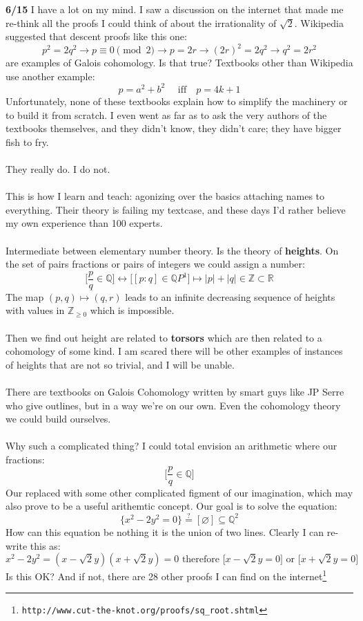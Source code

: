 \documentclass[12pt]{article}
\begin{document}
\noindent \textbf{6/15} I have a lot on my mind.  I saw a discussion on the internet that made me re-think all the proofs I could think of about the irrationality of $\sqrt{2}$.  Wikipedia suggested that descent proofs like this one:
$$ p^2 = 2q^2 \to p \equiv 0 \pmod 2 \to p = 2r \to (2r)^2 = 2q^2 \to q^2 = 2r^2  $$
are examples of Galois cohomology.  Is that true? Textbooks other than Wikipedia use another example:
$$ p = a^2 + b^2 \quad\text{ iff}\quad p = 4k+1 $$
Unfortunately, none of these textbooks explain how to simplify the machinery or to build it from scratch.   I even went as far as to ask the very authors of the textbooks themselves, and they didn't know, they didn't care; they have bigger fish to fry. \\ \\
They really do.  I do not.  \\ \\
This is how I learn and teach: agonizing over the basics attaching names to everything. Their theory is failing my textcase, and these days I'd rather believe my own experience than 100 experts.\\ \\
Intermediate between elementary number theory.  Is the theory of \textbf{heights}.  On the set of pairs fractions or pairs of integers we could assign a number:
$$ \bigg[ \frac{p}{q} \in \mathbb{Q} \bigg] \leftrightarrow  \bigg[ [p:q] \in \mathbb{Q}P^1 \bigg] \mapsto |p|+|q| \in \mathbb{Z} \subset \mathbb{R} $$
The map $(p,q) \mapsto (q,r)$ leads to an infinite decreasing sequence of heights with values in $\mathbb{Z}_{\geq 0}$ which is impossible.  \\ \\
Then we find out height are related to \textbf{torsors} which are then related to a cohomology of some kind.  I am scared there will be other examples of instances of heights that are not so trivial, and I will be unable. \\ \\
There are textbooks on Galois Cohomology written by smart guys like JP Serre who give outlines, but in a way we're on our own.  Even the cohomology theory we could build ourselves. \\ \\
Why such a complicated thing?  I could total envision an arithmetic where our fractions:
$$ \bigg[ \frac{p}{q} \in \mathbb{Q} \bigg] $$
Our replaced with some other complicated figment of our imagination, which may also prove to be a useful arithemtic concept.  Our goal is to solve the equation:
$$  \bigg\{  x^2 - 2y^2 = 0 \bigg\} \stackrel{?}{=} [\varnothing ]\subseteq \mathbb{Q}^2  $$
How can this equation be nothing it is the union of two lines.  Clearly I can re-write this as:
$$ x^2 - 2y^2 = (x-\sqrt{2}y) ( x + \sqrt{2}y) = 0 \text{ therefore } \Big[ x-\sqrt{2}y = 0\Big] \text{ or }
\Big[ x+\sqrt{2}y = 0 \Big] $$
Is this OK?  And if not, there are 28 other proofs I can find on the internet\footnote{\texttt{http://www.cut-the-knot.org/proofs/sq\_{}root.shtml}}
\vfill 
\end{document}
